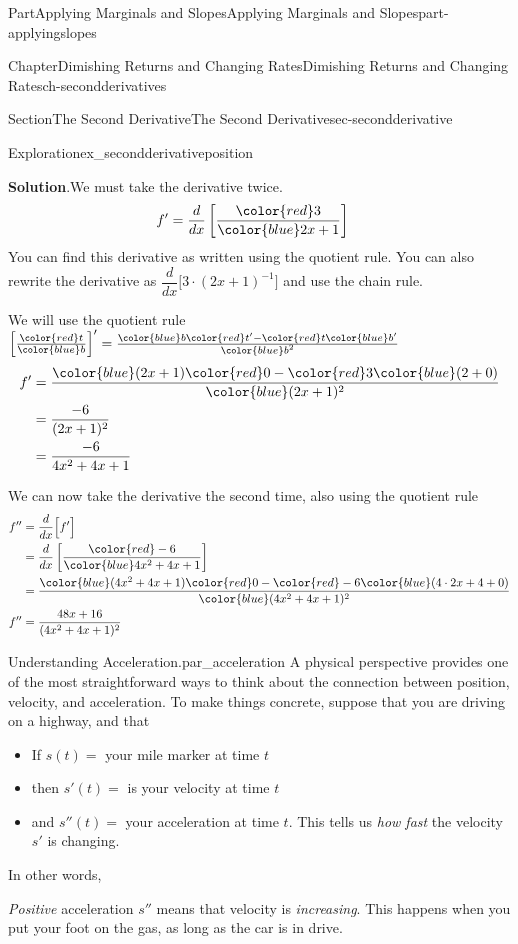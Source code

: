 \documentclass{tufte-book}
\newcommand{\blocktitlefont}{\relax}
\numberwithin{equation}{chapter}
\newcommand{\red}[1]{   {\color{red}   #1}   }
\newcommand{\blue}[1]{  {\color{blue}  #1}  }
\newcommand{\ddx}[1]{ \dfrac{d}{dx} \Big[ #1 \Big]  }
\newcommand{\ddxfrac}[1]{ \dfrac{d}{dx} \left[ #1 \right]  }
\newcommand{\D}[1]{ \Big[ #1 \Big]'  }
\newcommand{\amp}{&}
\begin{document}
\begin{partptx}{Part}{Applying Marginals and Slopes}{}{Applying Marginals and Slopes}{}{}{part-applyingslopes}
\begin{chapterptx}{Chapter}{Dimishing Returns and Changing Rates}{}{Dimishing Returns and Changing Rates}{}{}{ch-secondderivatives}
\begin{sectionptx}{Section}{The Second Derivative}{}{The Second Derivative}{}{}{sec-secondderivative}
\begin{exploration}{Exploration}{}{ex_secondderivativeposition}
\par\smallskip%
\noindent\textbf{\blocktitlefont Solution}.\hypertarget{ex_secondderivativeposition-2}{}\quad{}We must take the derivative twice.%
\begin{align*}
f' \amp = \ddxfrac{\frac{\red{3}}{\blue{2x+1}} } 
\end{align*}
You can find this derivative as written using the quotient rule. You can also rewrite the derivative as \(\ddx{ 3\cdot(2x+1)^{-1}}\) and use the chain rule.%
\par
We will use the quotient rule \(\D{\frac{\red{t}}{\blue{b}}} = \frac{\blue{b}\red{t'}-\red{t}\blue{b'}}{\blue{b}^2}\)%
\begin{align*}
f' \amp = \dfrac{\blue{(2x+1)}\red{0} - \red{3}\blue{(2+0)}}{\blue{(2x+1)^2}}  \\
\amp = \dfrac{-6}{(2x+1)^2}  \\
\amp = \dfrac{-6}{4x^2 + 4x + 1}  
\end{align*}
%
\par
We can now take the derivative the second time, also using the quotient rule%
\begin{align*}
f'' \amp = \ddx{f'} \\
\amp = \ddxfrac{ \dfrac{\red{-6}}{\blue{4x^2 + 4x + 1}} }\\
\amp =  \dfrac{\blue{(4x^2 + 4x + 1)}\red{0}-\red{-6}\blue{(4\cdot 2x + 4 + 0)}}{\blue{ (4x^2 + 4x + 1)^2}} \\
f'' \amp =  \dfrac{  48x + 16  }{  (4x^2 + 4x + 1)^2  } 
\end{align*}
%
\end{exploration}%
\begin{paragraphs}{Understanding Acceleration.}{par_acceleration}%
A physical perspective provides one of the most straightforward ways to think about the connection between position, velocity, and acceleration. To make things concrete, suppose that you are driving on a highway, and that%
\par
%
\begin{itemize}[label=\textbullet]
\item{}If \(s(t) = \) your mile marker at time \(t\)%
\item{}then \(s'(t) = \) is your velocity at time \(t\)%
\item{}and \(s''(t) = \) your acceleration at time \(t\). This tells us \emph{how fast} the velocity \(s'\) is changing.%
\end{itemize}
In other words,%
\par
\emph{Positive} acceleration \(s''\) means that velocity is \emph{increasing}.  This happens when you put your foot on the gas, as long as the car is in drive.%

\end{paragraphs}
\end{sectionptx}
\end{chapterptx}
\end{partptx}
\end{document}
